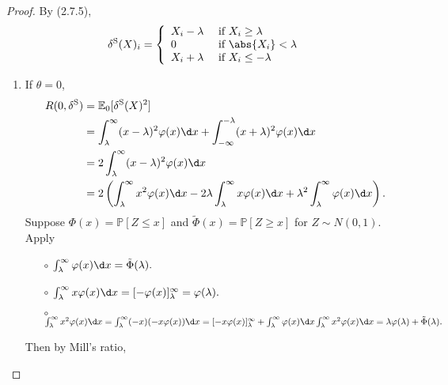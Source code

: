 \documentclass[a4paper]{article}
\begin{document}
\begin{proof}
	By (2.7.5), 
	\begin{equation}
		\delta^{\text{S}}(X)_i = 
		\left\{
		\begin{array}{ll}
			X_i - \lambda & \text{ if } X_i \geq \lambda \\
			0 & \text{ if } \abs{X_i} < \lambda \\
			X_i + \lambda & \text{ if } X_i \leq -\lambda \\
		\end{array}\right.
	\end{equation}
	\begin{enumerate}
		\item If $\theta = 0$,
		\begin{equation*}
			\begin{aligned}
				R(0,\delta^{\text{S}}) &= \mathbb{E}_0[\delta^{\text{S}}(X)^2] \\
				&= \int_{\lambda}^{\infty}  (x-\lambda)^2 \varphi(x) \d x + \int_{-\infty}^{-\lambda}  (x+\lambda)^2 \varphi(x) \d x \\
				&= 2 \int_{\lambda}^{\infty}  (x-\lambda)^2 \varphi(x) \d x \\
				&= 2\left(\int_{\lambda}^{\infty} x^2 \varphi(x)\d x - 2 \lambda \int_{\lambda}^{\infty} x \varphi(x) \d x + \lambda^2 \int_{\lambda}^{\infty} \varphi(x) \d x\right).
			\end{aligned}
		\end{equation*}
		Suppose $\Phi(x) = \mathbb{P}[Z \leq x]$ and $\tilde{\Phi}(x) = \mathbb{P}[Z \geq x]$ for $Z \sim N(0,1)$. Apply
		\begin{itemize}
			\item[$\circ$] $\int_{\lambda}^{\infty} \varphi(x) \d x = \tilde{\Phi}(\lambda).$ \\ 
			\item[$\circ$] $\int_{\lambda}^{\infty} x \varphi(x) \d x = [-\varphi(x)]_\lambda^\infty = \varphi(\lambda).$ \\
			\item[$\circ$] $\int_{\lambda}^{\infty} x^2 \varphi(x)\d x = \int_{\lambda}^{\infty} (-x)(-x\varphi(x)) \d x = [-x\varphi(x)]_\lambda^\infty + \int_{\lambda}^{\infty} \varphi(x) \d x \\ \\ \int_{\lambda}^{\infty} x^2 \varphi(x)\d x = \lambda \varphi(\lambda) + \tilde{\Phi}(\lambda).$
		\end{itemize}
		Then by Mill's ratio,
		\begin{equation}

\end{equation}
\end{enumerate}
\end{proof}
\end{document}
